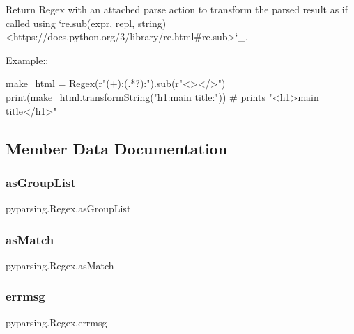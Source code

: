 \begin{DoxyVerb}Return Regex with an attached parse action to transform the parsed
result as if called using `re.sub(expr, repl, string) <https://docs.python.org/3/library/re.html#re.sub>`_.

Example::

    make_html = Regex(r"(\w+):(.*?):").sub(r"<\1>\2</\1>")
    print(make_html.transformString("h1:main title:"))
    # prints "<h1>main title</h1>"
\end{DoxyVerb}
 

\subsection{Member Data Documentation}
\mbox{\label{classpyparsing_1_1Regex_a2aa294b82c85a3c8201aceaf9e88e98c}} 
\subsubsection{\texorpdfstring{as\+Group\+List}{asGroupList}}
{\footnotesize\ttfamily pyparsing.\+Regex.\+as\+Group\+List}

\mbox{\label{classpyparsing_1_1Regex_a5ac786a184a9f8a86abb05d98b7aabe8}} 
\subsubsection{\texorpdfstring{as\+Match}{asMatch}}
{\footnotesize\ttfamily pyparsing.\+Regex.\+as\+Match}

\mbox{\label{classpyparsing_1_1Regex_af2c86b78888a0803c99dc50348e2818c}} 
\subsubsection{\texorpdfstring{errmsg}{errmsg}}
{\footnotesize\ttfamily pyparsing.\+Regex.\+errmsg}

\mbox{\label{classpyparsing_1_1Regex_a1513664a667650fd7ab74ee9a06314e7}} 
